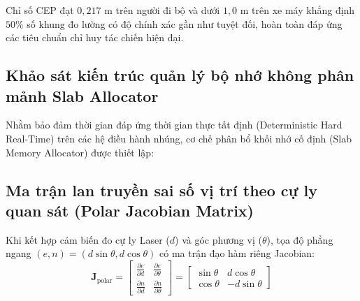 Chỉ số CEP đạt $0{,}217$ m trên người đi bộ và dưới $1{,}0$ m trên xe máy khẳng định $50\%$ số khung đo lường có độ chính xác gần như tuyệt đối, hoàn toàn đáp ứng các tiêu chuẩn chỉ huy tác chiến hiện đại.

\subsection{Khảo sát kiến trúc quản lý bộ nhớ không phân mảnh Slab Allocator}

\hspace{0.5cm} Nhằm bảo đảm thời gian đáp ứng thời gian thực tất định (Deterministic Hard Real-Time) trên các hệ điều hành nhúng, cơ chế phân bổ khối nhớ cố định (Slab Memory Allocator) được thiết lập:

\begin{table}[H]
\centering
\caption{So sánh hiệu năng giữa cơ chế cấp phát động Heap và bộ cấp phát khối cố định Slab}
\label{tab:slab-allocator-comparison}
\end{table}

\subsection{Ma trận lan truyền sai số vị trí theo cự ly quan sát (Polar Jacobian Matrix)}

\hspace{0.5cm} Khi kết hợp cảm biến đo cự ly Laser ($d$) và góc phương vị ($\theta$), tọa độ phẳng ngang $(e, n) = (d \sin\theta, d \cos\theta)$ có ma trận đạo hàm riêng Jacobian:
\begin{equation}
\mathbf{J}_{\text{polar}} = \begin{bmatrix}
\frac{\partial e}{\partial d} & \frac{\partial e}{\partial \theta} \\
\frac{\partial n}{\partial d} & \frac{\partial n}{\partial \theta}
\end{bmatrix} = \begin{bmatrix}
\sin\theta & d \cos\theta \\
\cos\theta & -d \sin\theta
\end{bmatrix}
\label{eq:polar-jacobian-matrix}
\end{equation}

